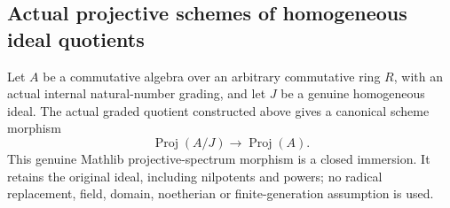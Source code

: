 \subsection{Actual projective schemes of homogeneous ideal quotients}
\label{subsec:homogeneous-projective-quotients}

\begin{theorem}
\label{graded:projective-homogeneous-quotient-immersion}
\leanok
{}
Let $A$ be a commutative algebra over an arbitrary commutative ring $R$,
with an actual internal natural-number grading, and let $J$ be a genuine
homogeneous ideal. The actual graded quotient constructed above gives
a canonical scheme morphism
\[
 \operatorname{Proj}(A/J)\longrightarrow\operatorname{Proj}(A).
\]
This genuine Mathlib projective-spectrum morphism is a closed immersion.
It retains the original ideal, including nilpotents and powers; no
radical replacement, field, domain, noetherian or finite-generation
assumption is used.
\end{theorem}
